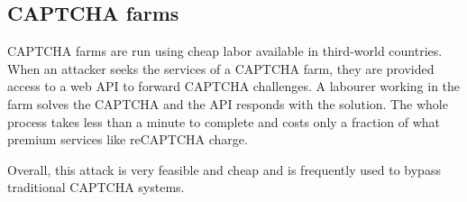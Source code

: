 \subsection{CAPTCHA farms}
CAPTCHA farms are run using cheap labor available in third-world countries. When
an attacker seeks the services of a CAPTCHA farm, they are provided access to a
web API to forward CAPTCHA challenges. A labourer working in the farm solves the
CAPTCHA and the API responds with the solution. The whole process takes less
than a minute to complete and costs only a fraction of what premium services
like reCAPTCHA charge.

Overall, this attack is very feasible and cheap and is frequently used to bypass
traditional CAPTCHA systems.

